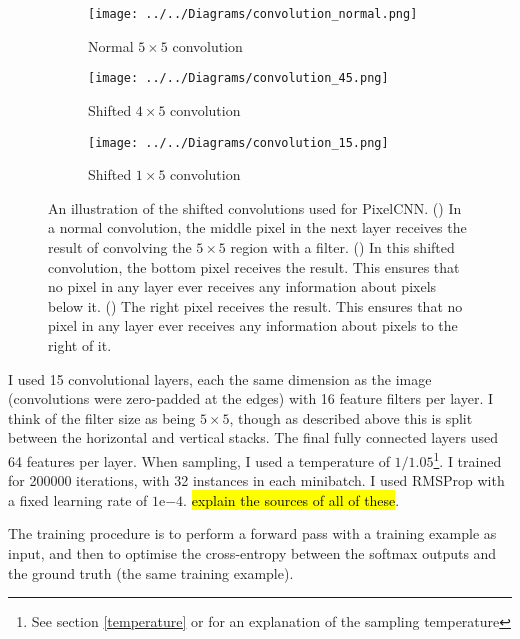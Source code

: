\documentclass[10pt,a4paper]{article}
\begin{document}
\begin{figure}
  \centering
    \begin{subfigure}{0.3\columnwidth}
        \centering
        \caption{Normal $5\times 5$ convolution}
        \texttt{[image: ../../Diagrams/convolution\_normal.png]} 
        \label{convolutions:normal}
    \end{subfigure}
    \hfill
    \begin{subfigure}{0.3\columnwidth}
        \centering
        \caption{Shifted $4\times 5$ convolution}
        \texttt{[image: ../../Diagrams/convolution\_45.png]} 
        \label{convolutions:45}
    \end{subfigure}
    \hfill
    \begin{subfigure}{0.3\columnwidth}
        \centering
        \caption{Shifted $1\times 5$ convolution}
        \texttt{[image: ../../Diagrams/convolution\_15.png]} 
        \label{convolutions:15}
    \end{subfigure}
  \caption{An illustration of the shifted convolutions used for PixelCNN. () In a normal convolution, the middle pixel in the next layer receives the result of convolving the $5\times 5$ region with a filter. () In this shifted convolution, the bottom pixel receives the result. This ensures that no pixel in any layer ever receives any information about pixels below it. () The right pixel receives the result. This ensures that no pixel in any layer ever receives any information about pixels to the right of it.}
  \label{convolutions}
\end{figure}

I used 15 convolutional layers, each the same dimension as the image (convolutions were zero-padded at the edges) with 16 feature filters per layer. I think of the filter size as being $5\times 5$, though as described above this is split between the horizontal and vertical stacks. The final fully connected layers used 64 features per layer. When sampling, I used a temperature of $1/1.05$\footnote{See section \ref{temperature} or \citet{pixelcnn2} for an explanation of the sampling temperature}. I trained for 200000 iterations, with 32 instances in each minibatch. I used RMSProp with a fixed learning rate of $1\mathrm{e}{-4}$. \hl{explain the sources of all of these}.

The training procedure is to perform a forward pass with a training example as input, and then to optimise the cross-entropy between the softmax outputs and the ground truth (the same training example).
\end{document}
